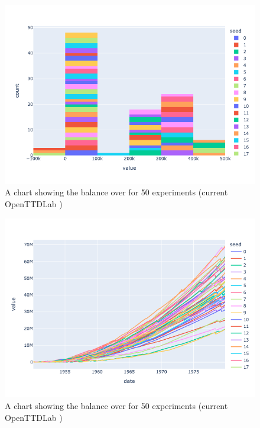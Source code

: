 \documentclass[logo,msc,dsti]{infthesis}    %
\begin{document}
\begin{figure}[h]
\centering
\includegraphics[width=\columnwidth]{assets/end-of-second-year-distribution.png}
\caption{A chart showing the balance over for 50 experiments (current OpenTTDLab )}
\label{fig:first-year}
\end{figure}

\begin{figure}[h]
\centering
\includegraphics[width=\columnwidth]{assets/value-over-time-2.png}
\caption{A chart showing the balance over for 50 experiments (current OpenTTDLab )}
\label{fig:value-over-time}
\end{figure}
\end{document}
